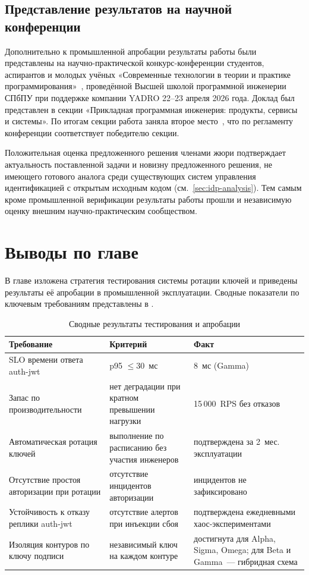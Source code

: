 \subsection{Представление результатов на научной конференции}\label{subsec:ch4-conference}

Дополнительно к промышленной апробации результаты работы
были представлены на научно-практической конкурс-конференции
студентов, аспирантов и молодых учёных
«Современные технологии в теории и практике
программирования»~\cite{SPbPUConference2026},
проведённой Высшей школой программной инженерии СПбПУ
при поддержке компании YADRO 22--23 апреля 2026 года.
Доклад был представлен в секции
«Прикладная программная инженерия: продукты, сервисы и системы».
По итогам секции работа заняла второе
место~\cite{SPbPUConference2026Results},
что по регламенту конференции соответствует
победителю секции.

Положительная оценка предложенного решения членами жюри
подтверждает актуальность поставленной задачи
и новизну предложенного решения,
не имеющего готового аналога среди существующих
систем управления идентификацией с открытым исходным кодом
(см.~\ref{sec:idp-analysis}).
Тем самым кроме промышленной верификации
результаты работы прошли и независимую оценку
внешним научно-практическим сообществом.

\section{Выводы по главе}\label{sec:ch4-conclusion}

В главе изложена стратегия тестирования системы ротации ключей
и приведены результаты её апробации в промышленной эксплуатации.
Сводные показатели по ключевым требованиям представлены
в .

\begin{table}[ht!]
  \centering
  \caption{Сводные результаты тестирования и апробации}
  \label{tab:ch4-results}
  \begin{tabular}{p{6cm}p{5cm}p{4cm}}
    \hline
    \textbf{Требование} & \textbf{Критерий} & \textbf{Факт} \\
    \hline
    SLO времени ответа auth-jwt & p95 $\leq 30$~мс & 8~мс (Gamma) \\
    Запас по производительности & нет деградации при кратном превышении нагрузки & 15\,000~RPS без отказов \\
    Автоматическая ротация ключей & выполнение по расписанию без участия инженеров & подтверждена за 2~мес. эксплуатации \\
    Отсутствие простоя авторизации при ротации & отсутствие инцидентов авторизации & инцидентов не зафиксировано \\
    Устойчивость к отказу реплики auth-jwt & отсутствие алертов при инъекции сбоя & подтверждена ежедневными хаос-экспериментами \\
    Изоляция контуров по ключу подписи & независимый ключ на каждом контуре & достигнута для Alpha, Sigma, Omega; для Beta и Gamma~--- гибридная схема \\
    \hline
  \end{tabular}
\end{table}

